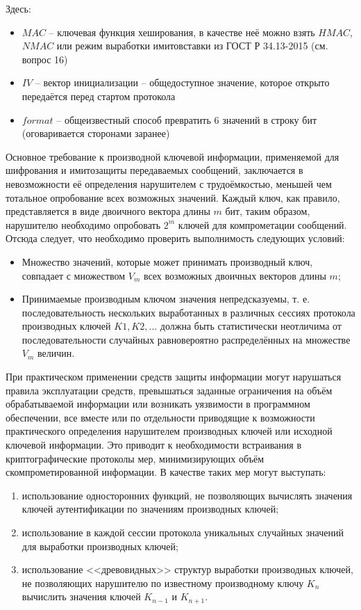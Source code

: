Здесь:

\begin{itemize}
	\item $MAC$ -- ключевая функция хеширования, в качестве неё можно взять $HMAC$, $NMAC$ или режим выработки имитовставки из ГОСТ Р 34.13-2015 (см. вопрос 16)
	\item $IV$ -- вектор инициализации -- общедоступное значение, которое открыто передаётся перед стартом протокола
	\item $format$ -- общеизвестный способ превратить 6 значений в строку бит (оговаривается сторонами заранее)
\end{itemize}

Основное требование к производной ключевой информации, применяемой для шифрования и имитозащиты передаваемых сообщений, заключается в невозможности её определения нарушителем с трудоёмкостью, меньшей чем тотальное опробование всех возможных значений. Каждый ключ, как правило, представляется в виде двоичного вектора длины $m$ бит, таким образом, нарушителю необходимо опробовать $2^m$ ключей для компрометации сообщений. Отсюда следует, что необходимо проверить выполнимость следующих условий:

\begin{itemize}
	\item Множество значений, которые может принимать производный ключ, совпадает с множеством $V_m$ всех возможных двоичных векторов длины $m$;
	\item Принимаемые производным ключом значения непредсказуемы, т. е. последовательность нескольких выработанных в различных сессиях протокола производных ключей $K1, K2, ...$ должна быть статистически неотличима от последовательности случайных равновероятно распределённых на множестве $V_m$ величин.
\end{itemize}

При практическом применении средств защиты информации могут нарушаться правила эксплуатации средств, превышаться заданные ограничения на объём обрабатываемой информации или возникать уязвимости в программном обеспечении, все вместе или по отдельности приводящие к возможности практического определения нарушителем производных ключей или исходной ключевой информации. Это приводит к необходимости встраивания в криптографические протоколы мер, минимизирующих объём скомпрометированной информации. В качестве таких мер могут выступать:

\begin{enumerate}
	\item использование односторонних функций, не позволяющих вычислять значения ключей аутентификации по значениям производных ключей; 
	\item использование в каждой сессии протокола уникальных случайных значений для выработки производных ключей; 
	\item использование <<древовидных>> структур выработки производных ключей, не позволяющих нарушителю по известному производному ключу $K_n$ вычислить значения ключей $K_{n-1}$ и $K_{n+1}$.
\end{enumerate}


